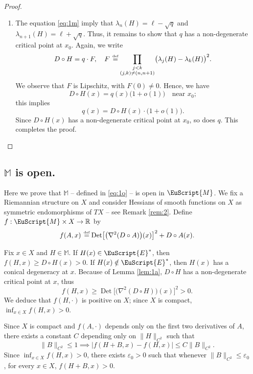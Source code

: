 \documentclass[JEP,XML,SOM,Unicode,NoFloatCountersInSection]{cedram}
\let\pazocal\EuScript
\theoremstyle{definition}
\DeclareMathOperator{\Det}{Det}
\newcommand{\EE}{\pazocal{E}}
\newcommand{\MM}{\pazocal{M}}
\newcommand{\R}{\mathbb{R}}
\newcommand{\Mm}{\mathbb{M}}
\let\epsi\varepsilon
\newcommand{\de}{\,\mathrel{\stackrel{\makebox[0pt]{\mbox{\normalfont\tiny def}}}{=}}}
\begin{document}
\begin{proof}
\begin{enumerate}
\item
The equation \eqref{eq:1m} imply that $\lambda_n(H) = \ell - \sqrt{q}$ and $\lambda_{n+1}(H) = \ell + \sqrt{q}$. Thus, it remains to show that $q$ has a non-degenerate critical point at $x_0$. Again, we write
\begin{equation*}
D \circ H = q \cdot F, \quad F \de \prod_{\substack{j < k \\ (j,k) \neq (n,n+1)}} \bigl(\lambda_j(H)-\lambda_k(H)\bigr)^2.
\end{equation*}
We observe that $F$ is Lipschitz, with $F(0) \neq 0$. Hence, we have
\[
D \circ H(x) = q(x) \bigl(1 + o(1)\bigr)\quad \text{near }x_0;
\]
this implies
\begin{equation*}
q(x) = D \circ H(x) \cdot \bigl( 1 + o(1) \bigr).
\end{equation*}
Since $D \circ H(x)$ has a non-degenerate critical point at $x_0$, so does $q$. This completes the proof.\qedhere
\end{enumerate}
\end{proof}

\subsection{$\Mm$ is open.}\label{sec:2.2} Here we prove that $\Mm$ -- defined in \eqref{eq:1o} -- is open in $\MM$. We fix a Riemannian structure on $X$ and consider Hessians of smooth functions on $X$ as symmetric endomorphisms of $TX$ -- see Remark \ref{rem:2}. Define $f : \MM \times X \to \R$ by
\begin{equation}\label{eq:0j}
f(A,x) \de \Det\bigl[ \bigl(\nabla^2 (D\circ A)\bigr)(x) \bigr]^2 + D \circ A(x).
\end{equation}

Fix $x \in X$ and $H \in \Mm$. If $H(x) \in \EE^*$, then $f(H,x) \geq D \circ H(x) > 0$. If $H(x) \notin \EE^*$, then $H(x)$ has a conical degeneracy at $x$. Because of Lemma \ref{lem:1a}, $D \circ H$ has a non-degenerate critical point at $x$, thus
\begin{equation*}
f(H,x) \geq \Det\bigl[ \bigl(\nabla^2 (D\circ H)\bigr)(x) \bigr]^2 > 0.
\end{equation*}
We deduce that $f(H,\cdot)$ is positive on $X$; since $X$ is compact, $\inf_{x \in X} f(H,x) > 0$.

Since $X$ is compact and $f(A,\cdot)$ depends only on the first two derivatives of $A$, there exists a constant $C$ depending only on $\| H \|_{C^2}$ such that
\begin{equation}\label{eq:0m}
\|B \|_{C^2} \leq 1 \implies
\big|f(H+B,x) - f(H,x)\big| \leq C \|B\|_{C^2}.
\end{equation}
Since $\inf_{x \in X} f(H,x) > 0$, there exists $\epsi_0 > 0$ such that whenever $\| B \|_{C^2} \leq \epsi_0$, for every $x \in X$, $f(H+B,x) > 0$.
\end{document}
